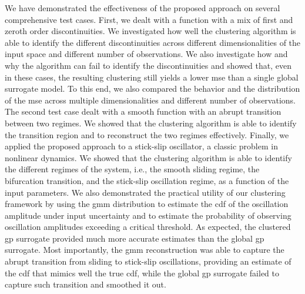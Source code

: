 \smallskip
We have demonstrated the effectiveness of the proposed approach on several comprehensive test cases. First, we dealt with a function with a mix of first and zeroth order discontinuities. We investigated how well the clustering algorithm is able to identify the different discontinuities across different dimensionalities of the input space and different number of observations. We also investigate how and why the algorithm can fail to identify the discontinuities and showed that, even in these cases, the resulting clustering still yields a lower \gls{mse} than a single global surrogate model. To this end, we also compared the behavior and the distribution of the \gls{mse} across multiple dimensionalities and different number of observations. The second test case dealt with a smooth function with an abrupt transition between two regimes. We showed that the clustering algorithm is able to identify the transition region and to reconstruct the two regimes effectively. Finally, we applied the proposed approach to a stick-slip oscillator, a classic problem in nonlinear dynamics. We showed that the clustering algorithm is able to identify the different regimes of the system, i.e., the smooth sliding regime, the bifurcation transition, and the stick-slip oscillation regime, as a function of the input parameters. We also demonstrated the practical utility of our clustering framework by using the \gls{gmm} distribution to estimate the \gls{cdf} of the oscillation amplitude under input uncertainty and to estimate the probability of observing oscillation amplitudes exceeding a critical threshold. As expected, the clustered \gls{gp} surrogate provided much more accurate estimates than the global \gls{gp} surrogate. Most importantly, the \gls{gmm} reconstruction was able to capture the abrupt transition from sliding to stick-slip oscillations, providing an estimate of the \gls{cdf} that mimics well the true \gls{cdf}, while the global \gls{gp} surrogate failed to capture such transition and smoothed it out.

\smallskip
{}

